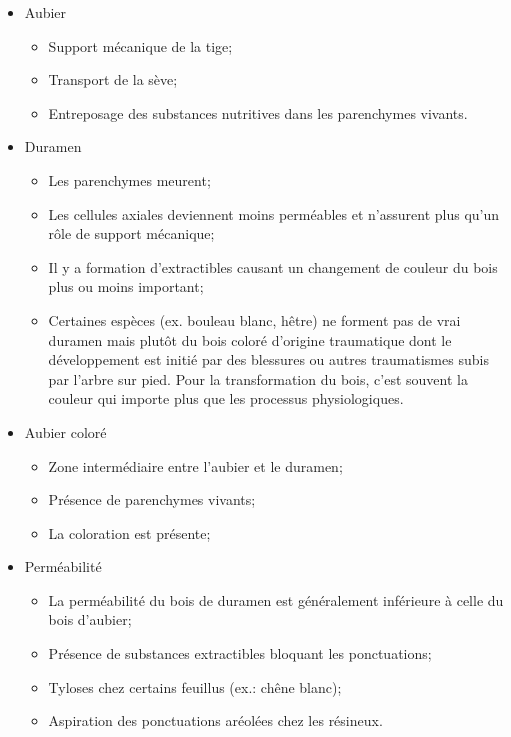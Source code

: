 \begin{itemize}

\item Aubier
	\begin{itemize}
	\item Support mécanique de la tige; 
	\item Transport de la sève; 
	\item Entreposage des substances nutritives dans les parenchymes vivants. 
	\end{itemize}

\item Duramen
	\begin{itemize}
	\item Les parenchymes meurent; 
	\item Les cellules axiales deviennent moins perméables et n'assurent plus qu'un rôle de support mécanique; 
	\item Il y a formation d'extractibles causant un changement de couleur du bois plus ou moins important; 
	\item Certaines espèces (ex. bouleau blanc, hêtre) ne forment pas de \og vrai \fg duramen mais plutôt du bois coloré d'origine traumatique dont le développement est initié par des blessures ou autres traumatismes subis par l'arbre sur pied. Pour la transformation du bois, c'est souvent la couleur qui importe plus que les processus physiologiques.  
	\end{itemize}
 
\item Aubier \og coloré \fg
	\begin{itemize}
	\item Zone intermédiaire entre l'aubier et le duramen; 
	\item Présence de parenchymes vivants; 
	\item La coloration est présente;
	\end{itemize} 
\item Perméabilité
	\begin{itemize}
	\item La perméabilité du bois de duramen est généralement inférieure à celle du bois d'aubier; 
	\item Présence de substances extractibles bloquant les ponctuations; 
	\item Tyloses chez certains feuillus (ex.: chêne blanc); 
	\item Aspiration des ponctuations aréolées chez les résineux.
	\end{itemize} 
 

\end{itemize}
